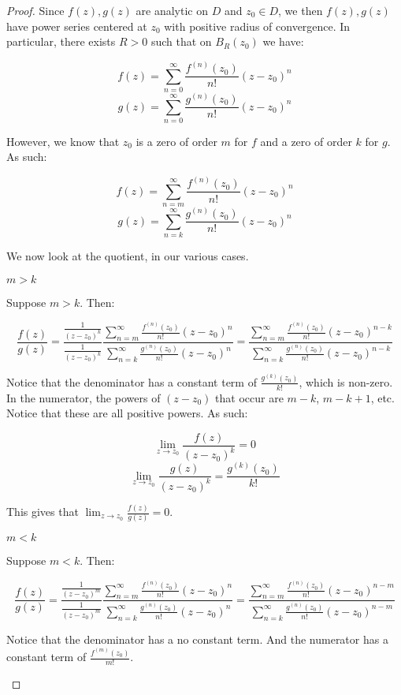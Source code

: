 \begin{proof} Since $f(z), g(z)$ are analytic on $D$ and $z_0\in D$, we then $f(z),g(z)$ have power series centered at $z_0$ with positive radius of convergence. In particular, there exists $R> 0$ such that on $B_R(z_0)$ we have:

$$f(z) = \sum_{n = 0}^\infty \frac{f^{(n)}(z_0)}{n!}(z-z_0)^n$$
$$g(z) = \sum_{n = 0}^\infty \frac{g^{(n)}(z_0)}{n!}(z-z_0)^n$$

However, we know that $z_0$ is a zero of order $m$ for $f$ and a zero of order $k$ for $g$. As such:

$$f(z) = \sum_{n = m}^\infty \frac{f^{(n)}(z_0)}{n!}(z-z_0)^n$$
$$g(z) = \sum_{n = k}^\infty \frac{g^{(n)}(z_0)}{n!}(z-z_0)^n$$


We now look at the quotient, in our various cases.

\begin{case}$m > k$

Suppose $m > k$. Then:

$$\frac{f(z)}{g(z)} = \frac{\frac{1}{(z-z_0)^k}}{\frac{1}{(z-z_0)^k}}\frac{\sum_{n = m}^\infty \frac{f^{(n)}(z_0)}{n!}(z-z_0)^n}{\sum_{n = k}^\infty \frac{g^{(n)}(z_0)}{n!}(z-z_0)^n} = \frac{\sum_{n = m}^\infty \frac{f^{(n)}(z_0)}{n!}(z-z_0)^{n - k}}{\sum_{n = k}^\infty \frac{g^{(n)}(z_0)}{n!}(z-z_0)^{n - k}}$$

Notice that the denominator has a constant term of $\frac{g^{(k)}(z_0)}{k!}$, which is non-zero. In the numerator, the powers of $(z-z_0)$ that occur are $m-k$, $m-k+1$, etc. Notice that these are all positive powers. As such:

$$\lim_{z\rightarrow z_0} \frac{f(z)}{(z-z_0)^k} = 0$$
$$\lim_{z\rightarrow z_0} \frac{g(z)}{(z-z_0)^k} = \frac{g^{(k)}(z_0)}{k!}$$

This gives that $\lim_{z\rightarrow z_0}\frac{f(z)}{g(z)} = 0$.

\end{case}

\begin{case}$m < k$

Suppose $m < k$. Then:


$$\frac{f(z)}{g(z)} = \frac{\frac{1}{(z-z_0)^m}}{\frac{1}{(z-z_0)^m}}\frac{\sum_{n = m}^\infty \frac{f^{(n)}(z_0)}{n!}(z-z_0)^n}{\sum_{n = k}^\infty \frac{g^{(n)}(z_0)}{n!}(z-z_0)^n} = \frac{\sum_{n = m}^\infty \frac{f^{(n)}(z_0)}{n!}(z-z_0)^{n - m}}{\sum_{n = k}^\infty \frac{g^{(n)}(z_0)}{n!}(z-z_0)^{n - m}}$$

Notice that the denominator has a no constant term. And the numerator has a constant term of $\frac{f^{(m)}(z_0)}{m!}$.


\end{case}
\end{proof}
